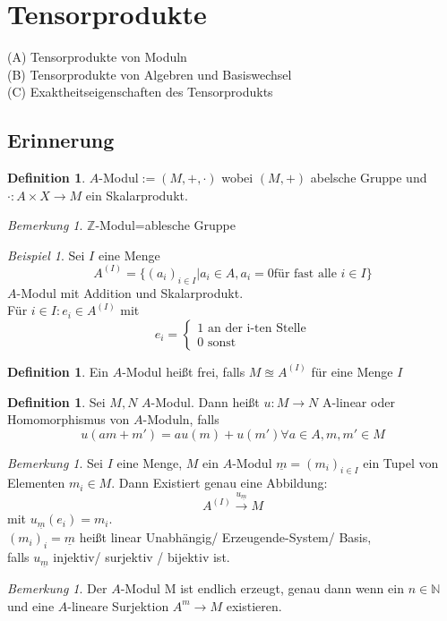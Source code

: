 \documentclass[10pt,a4paper]{article}
\newcommand{\N}{\ensuremath{\mathbb{N}}}
\newcommand{\Z}{\ensuremath{\mathbb{Z}}}
\newcounter{thm}[section]
\theoremstyle{definition}
\newtheorem{definition}[thm]{Definition}
\theoremstyle{plain}
\theoremstyle{remark}
\newtheorem{bem}[thm]{Bemerkung}
\newtheorem{exm}[thm]{Beispiel}
\begin{document}
\section{Tensorprodukte}
(A) Tensorprodukte von Moduln\\
(B) Tensorprodukte von Algebren und Basiswechsel\\
(C) Exaktheitseigenschaften des Tensorprodukts\\
\subsection{Erinnerung}
\begin{definition}
	$A$-Modul$:=(M,+,\cdot)$ wobei $(M,+)$ abelsche Gruppe und $\cdot:A\times X\rightarrow M$ ein Skalarprodukt.
\end{definition}
\begin{bem}
	$\Z$-Modul=ablesche Gruppe
\end{bem}
\begin{exm}
	Sei $I$ eine Menge
	\[A^{(I)}=\{(a_i)_{i\in I}|a_i\in A, a_i=0\text{für fast alle $i\in I$}\}\]
	$A$-Modul mit Addition und Skalarprodukt.\\
	Für $i\in I:e_i\in A^{(I)}$ mit
	\[e_i=\begin{cases}
	\text{1 an der i-ten Stelle}\\
	\text{0 sonst}
	\end{cases}\]
\end{exm}
\begin{definition}
	Ein $A$-Modul heißt frei, falls $M\approxeq A^{(I)}$ für eine Menge $I$
\end{definition}
\begin{definition}
	Sei $M,N$ $A$-Modul. Dann heißt $u:M\rightarrow N$ A-linear oder Homomorphismus von $A$-Moduln, falls
	\[u(am+m')=au(m)+u(m')\forall a\in A,m,m'\in M\]
\end{definition}
\begin{bem}
	Sei $I$ eine Menge, $M$ ein $A$-Modul $\underline{m}=(m_i)_{i\in I}$ ein Tupel von Elementen $m_i\in M$. Dann Existiert genau eine Abbildung:
	\[A^{(I)}\xrightarrow{u_{\underline m} }M\]
	mit $u_{\underline{m}}(e_i)=m_i$.\\
	$(m_i)_i=\underline{m}$ heißt linear Unabhängig/ Erzeugende-System/ Basis, \\
	falls $u_{\underline{m}}$ injektiv/ surjektiv / bijektiv ist.
\end{bem}
\begin{bem}
	Der $A$-Modul M ist endlich erzeugt, genau dann wenn ein $n\in \N$und eine $A$-lineare Surjektion $A^m\rightarrow M$ existieren.
\end{bem}
\end{document}
